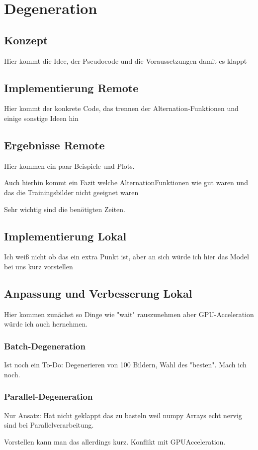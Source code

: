\chapter{Degeneration}
\section{Konzept}
Hier kommt die Idee, der Pseudocode und die Voraussetzungen damit es klappt

\section{Implementierung Remote}
Hier kommt der konkrete Code, das trennen der Alternation-Funktionen und einige sonstige Ideen hin 
\section{Ergebnisse Remote}
Hier kommen ein paar Beispiele und Plots. 

Auch hierhin kommt ein Fazit welche AlternationFunktionen wie gut waren und das die Trainingsbilder nicht geeignet waren

Sehr wichtig sind die benötigten Zeiten.
\section{Implementierung Lokal}
Ich weiß nicht ob das ein extra Punkt ist, aber an sich würde ich hier das Model bei uns kurz vorstellen

\section{Anpassung und Verbesserung Lokal}
Hier kommen zunächst so Dinge wie "wait" rauszunehmen aber GPU-Acceleration würde ich auch hernehmen. 
\subsection{Batch-Degeneration}
Ist noch ein To-Do: Degenerieren von 100 Bildern, Wahl des "besten". Mach ich noch.
\subsection{Parallel-Degeneration}
Nur Ansatz: Hat nicht geklappt das zu basteln weil numpy Arrays echt nervig sind bei Parallelverarbeitung. 

Vorstellen kann man das allerdings kurz. Konflikt mit GPUAcceleration. 